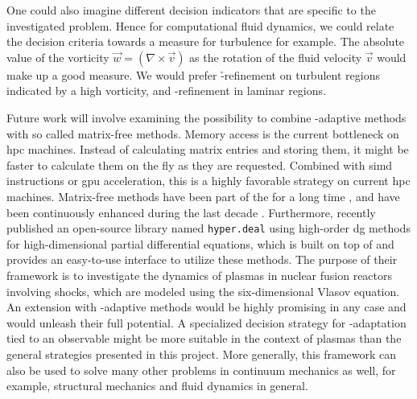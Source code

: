One could also imagine different decision indicators that are specific to the investigated problem. Hence for computational fluid dynamics, we could relate the decision criteria towards a measure for turbulence for example. The absolute value of the vorticity $\vec{w} = (\nabla \times \vec{v})$ as the rotation of the fluid velocity $\vec{v}$ would make up a good measure. We would prefer \h-refinement on turbulent regions indicated by a high vorticity, and \p-refinement in laminar regions.


Future work will involve examining the possibility to combine \hp-adaptive methods with so called matrix-free methods. Memory access is the current bottleneck on \gls{hpc} machines. Instead of calculating matrix entries and storing them, it might be faster to calculate them on the fly as they are requested. Combined with \gls{simd} instructions or \gls{gpu} acceleration, this is a highly favorable strategy on current \gls{hpc} machines. Matrix-free methods have been part of the \dealii{} for a long time \parencite{kronbichler2012}, and have been continuously enhanced during the last decade \parencite{kronbichler2019}. Furthermore, \textcite{munch2020} recently published an open-source library named \texttt{hyper.deal} using high-order \gls{dg} methods for high-dimensional partial differential equations, which is built on top of \dealii{} and provides an easy-to-use interface to utilize these methods. The purpose of their framework is to investigate the dynamics of plasmas in nuclear fusion reactors involving shocks, which are modeled using the six-dimensional Vlasov equation. An extension with \hp-adaptive methods would be highly promising in any case and would unleash their full potential. A specialized decision strategy for \hp-adaptation tied to an observable might be more suitable in the context of plasmas than the general strategies presented in this project. More generally, this framework can also be used to solve many other problems in continuum mechanics as well, for example, structural mechanics and fluid dynamics in general.



